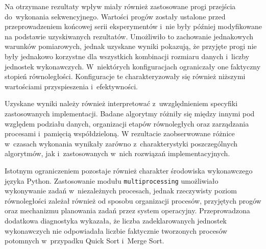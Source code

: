 Na otrzymane rezultaty wpływ miały również zastosowane progi przejścia do~wykonania sekwencyjnego.
Wartości progów zostały ustalone przed przeprowadzeniem końcowej serii eksperymentów 
i~nie były później modyfikowane na podstawie uzyskiwanych rezultatów. 
Umożliwiło to zachowanie jednakowych warunków pomiarowych, jednak uzyskane wyniki pokazują, 
że przyjęte progi nie były jednakowo korzystne dla wszystkich kombinacji rozmiaru danych i~liczby jednostek wykonawczych. 
W~niektórych konfiguracjach ograniczały one faktyczny stopień równoległości.
Konfiguracje te charakteryzowały się również niższymi wartościami przyspieszenia i~efektywności.

Uzyskane wyniki należy również interpretować z~uwzględnieniem specyfiki zastosowanych implementacji. 
Badane algorytmy różniły się między innymi pod względem podziału danych, 
organizacji etapów równoległych oraz zarządzania procesami i~pamięcią współdzieloną. 
W rezultacie zaobserwowane różnice w~czasach wykonania wynikały zarówno z~charakterystyki poszczególnych algorytmów, 
jak i~zastosowanych w~nich rozwiązań implementacyjnych.

Istotnym ograniczeniem pozostaje również charakter środowiska wykonawczego języka Python. 
Zastosowanie modułu \texttt{multiprocessing} umożliwiało wykonywanie zadań w~niezależnych procesach, 
jednak rzeczywisty poziom równoległości zależał również od sposobu organizacji procesów, 
przyjętych progów oraz mechanizmu planowania zadań przez system operacyjny.
Przeprowadzona dodatkowa diagnostyka wykazała, że liczba zadeklarowanych jednostek wykonawczych 
nie odpowiadała liczbie faktycznie tworzonych procesów potomnych w~przypadku Quick Sort i~Merge Sort.